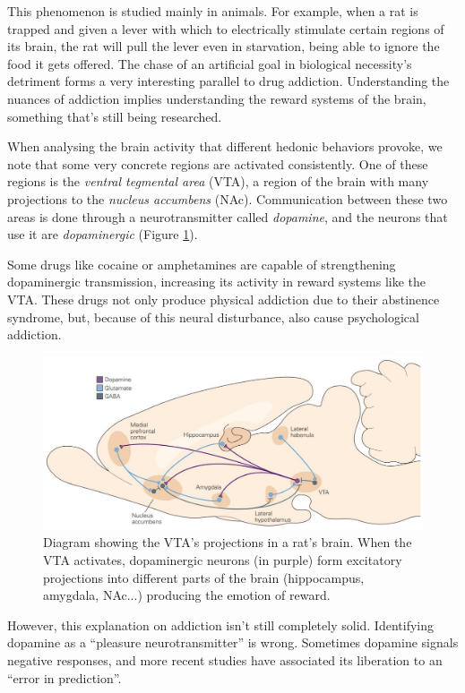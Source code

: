 This phenomenon is studied mainly in animals. For example, when a rat is trapped and given a lever with which to electrically stimulate certain regions of its brain, the rat will pull the lever even in starvation, being able to ignore the food it gets offered. The chase of an artificial goal in biological necessity's detriment forms a very interesting parallel to drug addiction. Understanding the nuances of addiction implies understanding the reward systems of the brain, something that's still being researched.

When analysing the brain activity that different hedonic behaviors provoke, we note that some very concrete regions are activated consistently. One of these regions is the \textit{ventral tegmental area} (VTA), a region of the brain with many projections to the \textit{nucleus accumbens} (NAc). Communication between these two areas is done through a neurotransmitter called \textit{dopamine}, and the neurons that use it are \textit{dopaminergic} (Figure \ref{ratbrain}).

Some drugs like cocaine or amphetamines are capable of strengthening dopaminergic transmission, increasing its activity in reward systems like the VTA. These drugs not only produce physical addiction due to their abstinence syndrome, but, because of this neural disturbance, also cause psychological addiction.

\begin{figure}[H]
	\centering
	\includegraphics[width=\linewidth]{media/8-ratbrain.png}
	\caption{Diagram showing the VTA's projections in a rat's brain. When the VTA activates, dopaminergic neurons (in purple) form excitatory projections into different parts of the brain (hippocampus, amygdala, NAc...) producing the emotion of reward.}
	\label{ratbrain}
\end{figure}

However, this explanation on addiction isn't still completely solid. Identifying dopamine as a \enquote{pleasure neurotransmitter} is wrong. Sometimes dopamine signals negative responses, and more recent studies have associated its liberation to an \enquote{error in prediction}.

